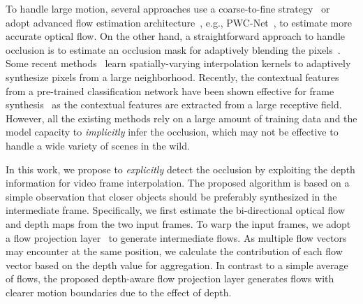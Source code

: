 \documentclass[10pt,twocolumn,letterpaper]{article}
\begin{document}
	
	
	
	
To handle large motion, several approaches use a coarse-to-fine strategy~\cite{liu2017video} or adopt advanced flow estimation architecture~\cite{niklaus2018context}, e.g., PWC-Net~\cite{sun2018pwc}, to estimate more accurate optical flow.
On the other hand, a straightforward approach to handle occlusion is to estimate an occlusion mask for adaptively blending the pixels~\cite{bao2018MEMC-Net, jiang2017super, xue2017video}.
Some recent methods~\cite{niklaus2017videoAdaConv,niklaus2017videoSepConv} learn spatially-varying interpolation kernels to adaptively synthesize pixels from a large neighborhood.
Recently, the contextual features from a pre-trained classification network have been shown effective for frame synthesis~\cite{niklaus2018context} as the contextual features are extracted from a large receptive field.
However, all the existing methods rely on a large amount of training data and the model capacity to \emph{implicitly} infer the occlusion, which may not be effective to handle a wide variety of scenes in the wild.
	
	
	
	
In this work, we propose to \emph{explicitly} detect the occlusion by exploiting the depth information for video frame interpolation.
The proposed algorithm is based on a simple observation that closer objects should be preferably synthesized in the intermediate frame.
Specifically, we first estimate the bi-directional optical flow and depth maps from the two input frames.
To warp the input frames, we adopt a flow projection layer~\cite{bao2018MEMC-Net} to generate intermediate flows.
As multiple flow vectors may encounter at the same position, we calculate the contribution of each flow vector based on the depth value for aggregation.
In contrast to a simple average of flows, the proposed depth-aware flow projection layer generates flows with clearer motion boundaries due to the effect of depth.
	
	
	
	
\end{document}
